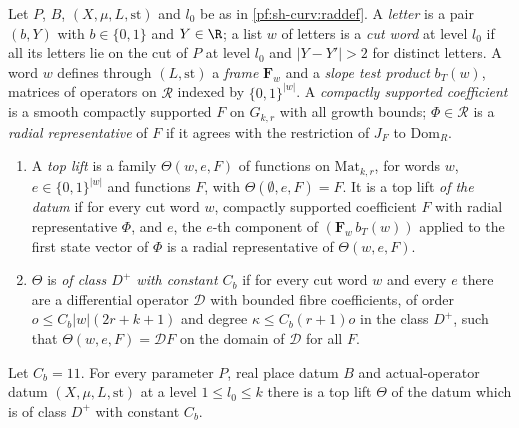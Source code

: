 \begin{definition}\label{pf:sh-curv:topliftdef}
Let $P$, $B$, $(X,\mu,L,\mathrm{st})$ and $l_0$ be as in \cref{pf:sh-curv:raddef}. A \emph{letter} is a pair $(b,Y)$ with
$b\in\{0,1\}$ and $Y\in\R$; a list $w$ of letters is a \emph{cut word} at level $l_0$ if all its letters lie on the cut of
$P$ at level $l_0$ and $|Y-Y'|>2$ for distinct letters. A word $w$ defines through $(L,\mathrm{st})$ a \emph{frame}
$\mathbf F_w$ and a \emph{slope test product} $b_T(w)$, matrices of operators on $\mathcal R$ indexed by
$\{0,1\}^{|w|}$. A \emph{compactly supported coefficient} is a smooth compactly supported $F$ on $G_{k,r}$ with all growth
bounds; $\Phi\in\mathcal R$ is a \emph{radial representative} of $F$ if it agrees with the restriction of $J_F$ to
$\mathrm{Dom}_R$.
\begin{enumerate}[label=(\alph*)]
\item A \emph{top lift} is a family $\Theta(w,e,F)$ of functions on $\mathrm{Mat}_{k,r}$, for words $w$,
$e\in\{0,1\}^{|w|}$ and functions $F$, with $\Theta(\emptyset,e,F)=F$. It is a top lift \emph{of the datum} if for every
cut word $w$, compactly supported coefficient $F$ with radial representative $\Phi$, and $e$, the $e$-th component of
$(\mathbf F_w\,b_T(w))$ applied to the first state vector of $\Phi$ is a radial representative of $\Theta(w,e,F)$.
\item $\Theta$ is \emph{of class $D^+$ with constant $C_b$} if for every cut word $w$ and every $e$ there are a
differential operator $\mathcal D$ with bounded fibre coefficients, of order $o\le C_b|w|(2r+k+1)$ and degree
$\kappa\le C_b(r+1)o$ in the class $D^+$, such that $\Theta(w,e,F)=\mathcal DF$ on the domain of $\mathcal D$ for all $F$.
\end{enumerate}
\end{definition}

\begin{theorem}\label{pf:sh-curv:toplift}
Let $C_b=11$. For every parameter $P$, real place datum $B$ and actual-operator datum $(X,\mu,L,\mathrm{st})$ at a level
$1\le l_0\le k$ there is a top lift $\Theta$ of the datum which is of class $D^+$ with constant $C_b$.
\end{theorem}


